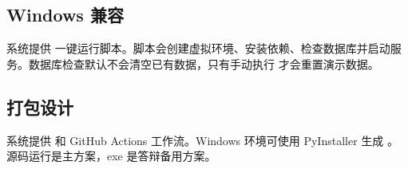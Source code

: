 \documentclass[UTF8,12pt]{ctexart}
\begin{document}
\subsection{Windows 兼容}

系统提供  一键运行脚本。脚本会创建虚拟环境、安装依赖、检查数据库并启动服务。数据库检查默认不会清空已有数据，只有手动执行  才会重置演示数据。

\subsection{打包设计}

系统提供  和 GitHub Actions 工作流。Windows 环境可使用 PyInstaller 生成 。源码运行是主方案，exe 是答辩备用方案。
\end{document}
